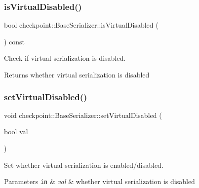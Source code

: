 \subsubsection{\texorpdfstring{is\+Virtual\+Disabled()}{isVirtualDisabled()}}
{\footnotesize\ttfamily bool checkpoint\+::\+Base\+Serializer\+::is\+Virtual\+Disabled (\begin{DoxyParamCaption}{ }\end{DoxyParamCaption}) const\hspace{0.3cm}{\ttfamily [inline]}}



Check if virtual serialization is disabled. 

\begin{DoxyReturn}{Returns}
whether virtual serialization is disabled 
\end{DoxyReturn}
\mbox{\label{structcheckpoint_1_1_base_serializer_ab16e2ffa62f03f8410b116c637bd4adc}} 
\subsubsection{\texorpdfstring{set\+Virtual\+Disabled()}{setVirtualDisabled()}}
{\footnotesize\ttfamily void checkpoint\+::\+Base\+Serializer\+::set\+Virtual\+Disabled (\begin{DoxyParamCaption}\item[{bool}]{val }\end{DoxyParamCaption})\hspace{0.3cm}{\ttfamily [inline]}}



Set whether virtual serialization is enabled/disabled. 


\begin{DoxyParams}[1]{Parameters}
\mbox{\tt in}  & {\em val} & whether virtual serialization is disabled \\
\hline
\end{DoxyParams}
\mbox{\label{structcheckpoint_1_1_base_serializer_a375bc80d210beae8ffd46229e800e3a0}} 

